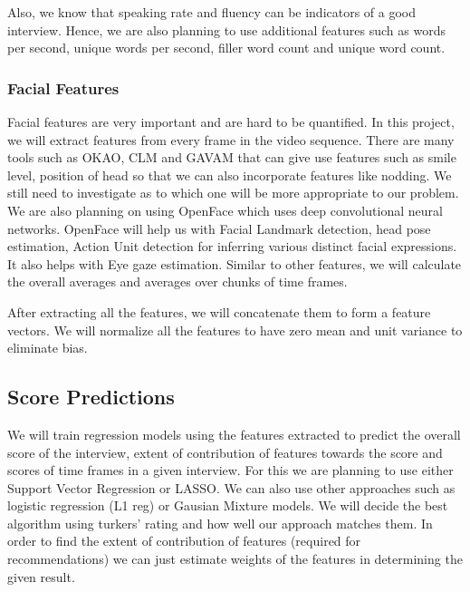 \documentclass[11pt]{article}
\begin{document}
Also, we know that speaking rate and fluency can be indicators of a good interview. Hence, we are also planning to use additional features such as words per second, unique words per second, filler word count and unique word count. 
\subsubsection{Facial Features}
Facial features are very important and are hard to be quantified. In this project, we will extract features from every frame in the video sequence. There are many tools such as OKAO, CLM and GAVAM that can give use features such as smile level, position of head so that we can also incorporate features like nodding. We still need to investigate as to which one will be more appropriate to our problem. We are also planning on using OpenFace which uses deep convolutional neural networks. OpenFace will help us with Facial Landmark detection, head pose estimation, Action Unit detection for inferring various distinct facial expressions. It also helps with Eye gaze estimation. Similar to other features, we will calculate the overall averages and averages over chunks of time frames.

After extracting all the features, we will concatenate them to form a feature vectors. We will normalize all the features to have zero mean and unit variance to eliminate bias.

\subsection{Score Predictions}
We will train regression models using the features extracted to predict the overall score of the interview, extent of contribution of features towards the score and scores of time frames in a given interview. For this we are planning to use either Support Vector Regression or LASSO. We can also use other approaches such as logistic regression (L1 reg) or Gausian Mixture models. We will decide the best algorithm using turkers' rating and how well our approach matches them. In order to find the extent of contribution of features (required for recommendations) we can just estimate weights of the features in determining the given result.

\newpage
\end{document}
